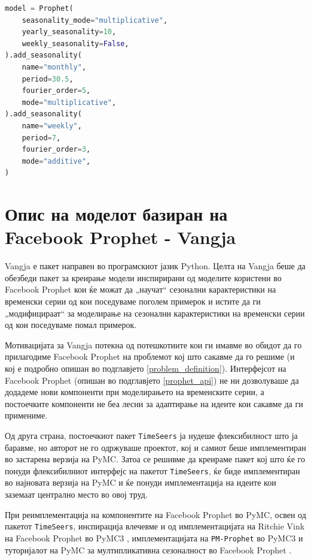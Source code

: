 \documentclass[12pt]{article}
\numberwithin{equation}{section}
\begin{document}
\begin{lstlisting}[language=Python,caption=Дефинирање на покомплексен Facebook Prophet модел]
model = Prophet(
    seasonality_mode="multiplicative",
    yearly_seasonality=10,
    weekly_seasonality=False,
).add_seasonality(
    name="monthly",
    period=30.5,
    fourier_order=5,
    mode="multiplicative",
).add_seasonality(
    name="weekly",
    period=7,
    fourier_order=3,
    mode="additive",
)
\end{lstlisting}

\newpage

\section{Опис на моделот базиран на Facebook Prophet - Vangja}

Vangja е пакет направен во програмскиот јазик Python. Целта на Vangja беше да обезбеди пакет за креирање модели инспирирани од моделите користени во Facebook Prophet кои ќе можат да „научат“ сезонални карактеристики на временски серии од кои поседуваме поголем примерок и истите да ги „модифицираат“ за моделирање на сезонални карактеристики на временски серии од кои поседуваме помал примерок.

Мотивацијата за Vangja потекна од потешкотиите кои ги имавме во обидот да го прилагодиме Facebook Prophet на проблемот кој што сакавме да го решиме (и кој е подробно опишан во подглавјето \ref{problem_definition}). Интерфејсот на Facebook Prophet (опишан во подглавјето \ref{prophet_api}) не ни дозволуваше да додадеме нови компоненти при моделирањето на временските серии, а постоечките компоненти не беа лесни за адаптирање на идеите кои сакавме да ги примениме.

Од друга страна, постоечкиот пакет \verb|TimeSeers| \cite{timeseers2021} ја нудеше флексибилност што ја баравме, но авторот не го одржуваше проектот, кој и самиот беше имплементиран во застарена верзија на PyMC. Затоа се решивме да креираме пакет кој што ќе го понуди флексибилниот интерфејс на пакетот \verb|TimeSeers|, ќе биде имплементиран во најновата верзија на PyMC и ќе понуди имплементација на идеите кои заземаат централно место во овој труд.

При реимплементација на компонентите на Facebook Prophet во PyMC, освен од пакетот \verb|TimeSeers|, инспирација влечевме и од имплементацијата на Ritchie Vink на Facebook Prophet во PyMC3 \cite{vink}, имплементацијата на \verb|PM-Prophet| \cite{pmprophet2020} во PyMC3 и туторијалот на PyMC за мултипликативна сезоналност во Facebook Prophet \cite{airpassengers}.
\end{document}
